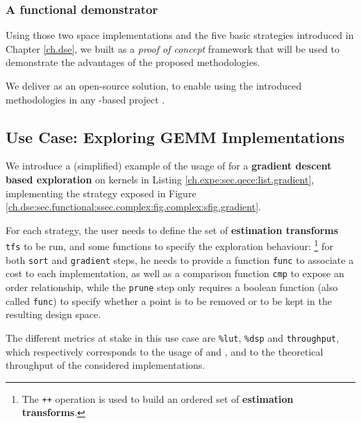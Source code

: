         \subsubsection{A functional demonstrator}
            Using those two space implementations and the five basic strategies introduced in Chapter \ref{ch.dse}, we built  as a {\it proof of concept} framework that will be used to demonstrate the advantages of the proposed methodologies.

            We deliver  as an open-source solution, to enable using the introduced methodologies in any \chisel-based project \cite{ferres_qece_2021}.

    \subsection{Use Case: Exploring GEMM Implementations}
    \label{ch.expe:sec.qece:ssec.usecase}

            We introduce a (simplified) example of the usage of  for a {\bf gradient descent based exploration} on  kernels in Listing \ref{ch.expe:sec.qece:list.gradient}, implementing the strategy exposed in Figure \ref{ch.dse:sec.functional:ssec.complex:fig.complex:sfig.gradient}.

            For each strategy, the user needs to define the set of {\bf estimation transforms} \lstinline{tfs} to be run, and some functions to specify the exploration behaviour:%
            \footnote{ The \lstinline{++} operation is used to build an ordered set of {\bf estimation transforms}.} %
            for both \lstinline{sort} and \lstinline{gradient} steps, he needs to provide a function \lstinline{func} to associate a cost to each implementation, as well as a comparison function \lstinline{cmp} to expose an order relationship, while the \lstinline{prune} step only requires a boolean function (also called \lstinline{func}) to specify whether a point is to be removed or to be kept in the resulting design space.

            The different metrics at stake in this use case are \lstinline{%lut}, \lstinline{%dsp} and \lstinline{throughput}, which respectively corresponds to the usage of  and , and to the theoretical throughput of the considered implementations.

